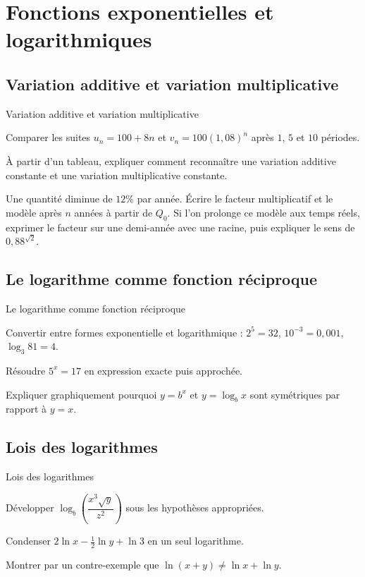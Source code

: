 \chapter{Fonctions exponentielles et logarithmiques}
\label{workbook:chapter:06}
\section{Variation additive et variation multiplicative}
\label{workbook:section:06.01}
\begin{exerciseblock}{Variation additive et variation multiplicative}
\item Comparer les suites $u_n=100+8n$ et $v_n=100(1{,}08)^n$ après $1$, $5$ et $10$ périodes.
\item À partir d'un tableau, expliquer comment reconnaître une variation additive constante et une variation multiplicative constante.
\item Une quantité diminue de $12\%$ par année. Écrire le facteur multiplicatif et le modèle après $n$ années à partir de $Q_0$. Si l'on prolonge ce modèle aux temps réels, exprimer le facteur sur une demi-année avec une racine, puis expliquer le sens de $0{,}88^{\sqrt2}$.
\end{exerciseblock}
\section{Le logarithme comme fonction réciproque}
\label{workbook:section:06.02}
\begin{exerciseblock}{Le logarithme comme fonction réciproque}
\item Convertir entre formes exponentielle et logarithmique : $2^5=32$, $10^{-3}=0{,}001$, $\log_3 81=4$.
\item Résoudre $5^x=17$ en expression exacte puis approchée.
\item Expliquer graphiquement pourquoi $y=b^x$ et $y=\log_bx$ sont symétriques par rapport à $y=x$.
\end{exerciseblock}
\section{Lois des logarithmes}
\label{workbook:section:06.03}
\begin{exerciseblock}{Lois des logarithmes}
\item Développer $\log_b\left(\dfrac{x^3\sqrt y}{z^2}\right)$ sous les hypothèses appropriées.
\item Condenser $2\ln x-\frac12\ln y+\ln3$ en un seul logarithme.
\item Montrer par un contre-exemple que $\ln(x+y)\neq\ln x+\ln y$.
\end{exerciseblock}
